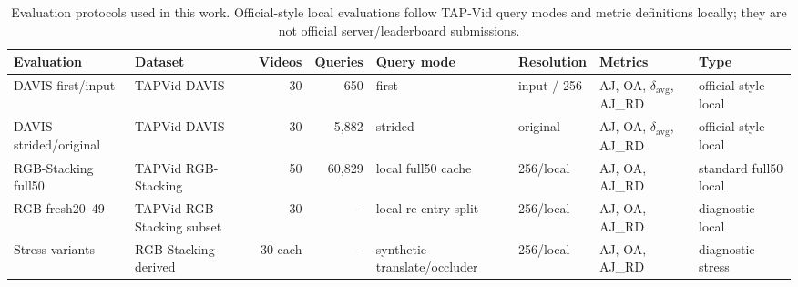 %

\begin{table}[t]
\centering
\caption{Evaluation protocols used in this work. Official-style local evaluations follow TAP-Vid query modes and metric definitions locally; they are not official server/leaderboard submissions.}
\label{tab:evaluation_protocols}
\small
\begin{adjustbox}{max width=\textwidth}
\begin{tabular}{llrrllll}
\toprule
Evaluation & Dataset & Videos & Queries & Query mode & Resolution & Metrics & Type \\
\midrule
DAVIS first/input & TAPVid-DAVIS & 30 & 650 & first & input / 256 & AJ, OA, $\delta_{\mathrm{avg}}$, AJ\_RD & official-style local \\
DAVIS strided/original & TAPVid-DAVIS & 30 & 5,882 & strided & original & AJ, OA, $\delta_{\mathrm{avg}}$, AJ\_RD & official-style local \\
RGB-Stacking full50 & TAPVid RGB-Stacking & 50 & 60,829 & local full50 cache & 256/local & AJ, OA, AJ\_RD & standard full50 local \\
RGB fresh20--49 & TAPVid RGB-Stacking subset & 30 & -- & local re-entry split & 256/local & AJ, OA, AJ\_RD & diagnostic local \\
Stress variants & RGB-Stacking derived & 30 each & -- & synthetic translate/occluder & 256/local & AJ, OA, AJ\_RD & diagnostic stress \\
\bottomrule
\end{tabular}
\end{adjustbox}
\end{table}

